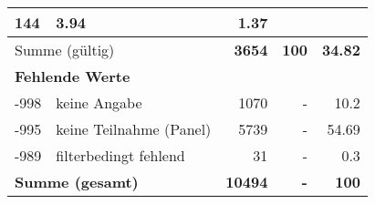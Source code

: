 \begin{longtable}{lXrrr}
       \num{144} &
       \num[round-mode=places,round-precision=2]{3,94} &
         \num[round-mode=places,round-precision=2]{1,37} \\
     \midrule
     \multicolumn{2}{l}{Summe (gültig)} &
       \textbf{\num{3654}} &
     \textbf{100} &
       \textbf{\num[round-mode=places,round-precision=2]{34,82}} \\
     \multicolumn{5}{l}{\textbf{Fehlende Werte}}\\
       -998 &
       keine Angabe &
         \num{1070} &
        - &
         \num[round-mode=places,round-precision=2]{10,2} \\
       -995 &
       keine Teilnahme (Panel) &
         \num{5739} &
        - &
         \num[round-mode=places,round-precision=2]{54,69} \\
       -989 &
       filterbedingt fehlend &
         \num{31} &
        - &
         \num[round-mode=places,round-precision=2]{0,3} \\
     \midrule
     \multicolumn{2}{l}{\textbf{Summe (gesamt)}} &
          \textbf{\num{10494}} &
        \textbf{-} &
        \textbf{100} \\
     \bottomrule
     \end{longtable}
     
